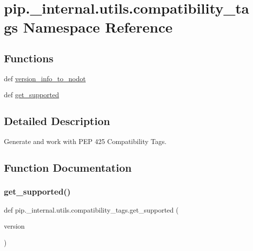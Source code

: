\hypertarget{namespacepip_1_1__internal_1_1utils_1_1compatibility__tags}{}\section{pip.\+\_\+internal.\+utils.\+compatibility\+\_\+tags Namespace Reference}
\label{namespacepip_1_1__internal_1_1utils_1_1compatibility__tags}
\subsection*{Functions}
\begin{DoxyCompactItemize}
\item 
def \hyperlink{namespacepip_1_1__internal_1_1utils_1_1compatibility__tags_a053eedc6192c2a50b77cca211410e599}{version\+\_\+info\+\_\+to\+\_\+nodot}
\item 
def \hyperlink{namespacepip_1_1__internal_1_1utils_1_1compatibility__tags_a714e62f4bedc8756b0d99a6cf21e164f}{get\+\_\+supported}
\end{DoxyCompactItemize}


\subsection{Detailed Description}
\begin{DoxyVerb}Generate and work with PEP 425 Compatibility Tags.
\end{DoxyVerb}
 

\subsection{Function Documentation}
\mbox{\label{namespacepip_1_1__internal_1_1utils_1_1compatibility__tags_a714e62f4bedc8756b0d99a6cf21e164f}} 
\subsubsection{\texorpdfstring{get\+\_\+supported()}{get\_supported()}}
{\footnotesize\ttfamily def pip.\+\_\+internal.\+utils.\+compatibility\+\_\+tags.\+get\+\_\+supported (\begin{DoxyParamCaption}\item[{}]{version }\end{DoxyParamCaption})}


